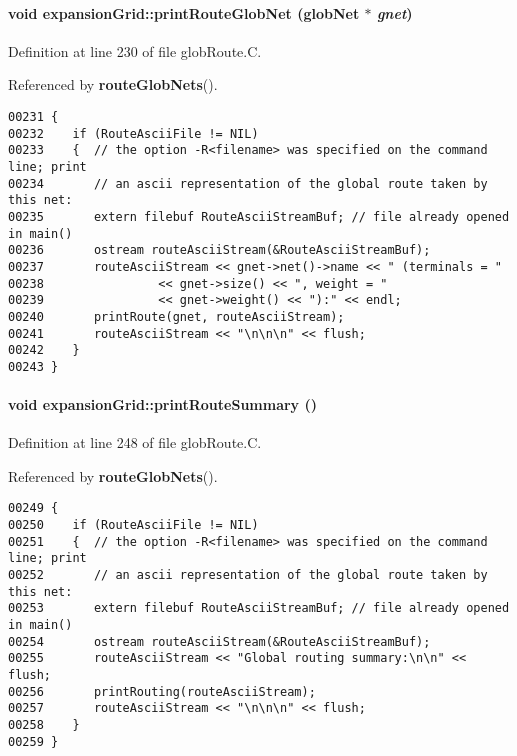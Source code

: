\paragraph{\setlength{\rightskip}{0pt plus 5cm}void expansion\-Grid::print\-Route\-Glob\-Net ({\bf glob\-Net} $\ast$ {\em gnet})\hspace{0.3cm}{\tt  [private]}}\hfill



Definition at line 230 of file glob\-Route.C.

Referenced by {\bf route\-Glob\-Nets}().\small\begin{verbatim}00231 {
00232    if (RouteAsciiFile != NIL)
00233    {  // the option -R<filename> was specified on the command line; print
00234       // an ascii representation of the global route taken by this net:
00235       extern filebuf RouteAsciiStreamBuf; // file already opened in main()
00236       ostream routeAsciiStream(&RouteAsciiStreamBuf);
00237       routeAsciiStream << gnet->net()->name << " (terminals = "
00238                << gnet->size() << ", weight = "
00239                << gnet->weight() << "):" << endl;
00240       printRoute(gnet, routeAsciiStream);
00241       routeAsciiStream << "\n\n\n" << flush;
00242    }
00243 }
\end{verbatim}\normalsize 
\label{expansionGrid_c8}
\paragraph{\setlength{\rightskip}{0pt plus 5cm}void expansion\-Grid::print\-Route\-Summary ()\hspace{0.3cm}{\tt  [private]}}\hfill



Definition at line 248 of file glob\-Route.C.

Referenced by {\bf route\-Glob\-Nets}().\small\begin{verbatim}00249 {
00250    if (RouteAsciiFile != NIL)
00251    {  // the option -R<filename> was specified on the command line; print
00252       // an ascii representation of the global route taken by this net:
00253       extern filebuf RouteAsciiStreamBuf; // file already opened in main()
00254       ostream routeAsciiStream(&RouteAsciiStreamBuf);
00255       routeAsciiStream << "Global routing summary:\n\n" << flush;
00256       printRouting(routeAsciiStream);
00257       routeAsciiStream << "\n\n\n" << flush;
00258    }
00259 }
\end{verbatim}\normalsize 
\label{expansionGrid_a11}
